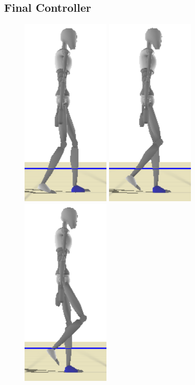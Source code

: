 \documentclass[conference]{acmsiggraph}
\begin{document}
\subsection{Final Controller}
\begin{figure}[t]
\centering
\includegraphics[scale=0.17]{images/strips/0_25/1.png}
\includegraphics[scale=0.17]{images/strips/0_25/2.png}
\includegraphics[scale=0.17]{images/strips/0_25/3.png}

\end{figure}
\end{document}
